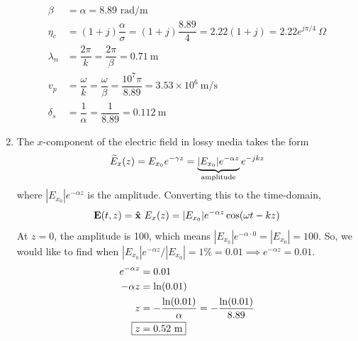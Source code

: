 \begin{example}
\begin{enumerate}[label=(\alph*), itemsep=0pt]
\begin{align*}
                \beta &= \alpha = 8.89 \text{ rad/m} \\ 
                \eta_c &= (1+j)\dfrac{\alpha}{\sigma} = (1+j) \dfrac{8.89}{4} = 2.22(1+j) = 2.22 e^{j\pi/4} \ \Omega \\ 
                \lambda_n &= \dfrac{2\pi}{k} = \dfrac{2\pi}{\beta} = 0.71 \ \text{m}  \\ 
                v_p &= \dfrac{\omega}{k} = \dfrac{\omega}{\beta} = \dfrac{10^7 \pi}{8.89} = 3.53 \times 10^{6} \ \text{m/s} \\ 
                \delta_s &= \dfrac{1}{\alpha} = \dfrac{1}{8.89} = 0.112\ \text{m} 
            \end{align*}

        \item The $x$-component of the electric field in lossy media takes the form 
        \begin{equation*}
            \widetilde{E}_x(z) = E_{x_0} e^{-\gamma z} = \underbrace{|E_{x_0}| e^{-\alpha z}}_{\text{amplitude}} e^{-jkz}
        \end{equation*}
        where $|E_{x_0}| e^{-\alpha z}$ is the amplitude. Converting this to the time-domain, 
        \begin{equation*}
            \boldsymbol{\mathrm{E}}(t,z) = \boldsymbol{{\mathrm{\hat{x}}}}\ E_x(z) = |E_{x_0}| e^{-\alpha z} \cos(\omega t - kz)
        \end{equation*}
        At $z=0$, the amplitude is 100, which means $|E_{x_0}| e^{-\alpha \cdot 0} = |E_{x_0}| = 100$. So, we would like to find when $|E_{x_0}| e^{-\alpha z}/|E_{x_0}| = 1\% = 0.01 \implies e^{-\alpha z} = 0.01$. 
        \begin{align*}
            e^{-\alpha z} &= 0.01 \\ 
            -\alpha z &= \ln(0.01) \\ 
            z &= -\dfrac{\ln(0.01)}{\alpha} = -\dfrac{\ln(0.01)}{8.89} \\ 
            \Aboxed{z &= 0.52 \ \text{m}}
        \end{align*}


\end{enumerate}
\end{example}
